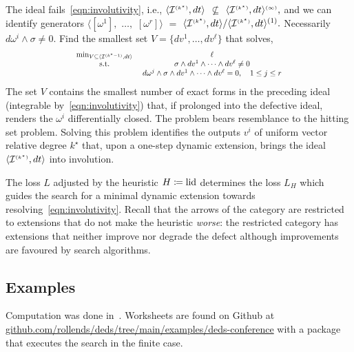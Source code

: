 \documentclass[a4paper]{ifacconf}
\begin{document}
The ideal fails~\eqref{eqn:involutivity}, i.e.,
\(
  \langle \mathcal{I}^{\smash{\scriptscriptstyle(k^\star)}}, dt \rangle
\)
\(\not\subseteq\)
\(
  \langle \mathcal{I}^{\smash{\scriptscriptstyle(k^\star)}}, dt \rangle^{\smash{\scriptscriptstyle(\infty)}},
\)
and we can identify generators
\(
  \langle [\omega^1],
\)
\(\ldots,\)
\([\omega^r] \rangle\)
\(=\)
\(
  \langle \mathcal{I}^{\smash{\scriptscriptstyle(k^\star)}}, dt \rangle / \langle \mathcal{I}^{\smash{\scriptscriptstyle(k^\star)}}, dt \rangle^{(1)}.
\)
Necessarily \(d\omega^i \wedge \sigma \neq 0.\)
Find the smallest set \(V = \{dv^1, \ldots, dv^\ell\}\) that solves,
\[
  \scalebox{0.8}{\mbox{\ensuremath{\displaystyle%
  \begin{array}{cc}
    \min_{%
        V \subseteq \langle \Ideal{I}^{\smash{\scriptscriptstyle(k^\star - 1)}}, dt\rangle        
    } 
      \;& \ell\\
    \text{s.t.}
      \;&
      \sigma \wedge dv^{1} \wedge \cdots \wedge dv^{\ell} \neq 0\\
      \;& 
      d\omega^j \wedge \sigma \wedge dv^{1} \wedge \cdots \wedge dv^{\ell} = 0,
      \quad
      1\leq j \leq r\\
  \end{array}
  }}}
\]
The set \(V\) contains the smallest number of exact forms in the preceding ideal (integrable by~\eqref{eqn:involutivity}) that, if prolonged into the defective ideal, renders the \(\omega^i\) differentially closed.
The problem bears resemblance to the hitting set problem.
Solving this problem identifies the outputs \(v^i\) of uniform vector relative degree \(k^\star\) that, upon a one-step dynamic extension, brings the ideal 
\(
  \langle \mathcal{I}^{\smash{\scriptscriptstyle(k^\star)}}, dt \rangle
\)
into involution.

The loss \(L\) adjusted by the heuristic \(H \coloneq \operatorname{lid}\) determines the loss \(L_H\) which guides the search for a minimal dynamic extension towards resolving~\eqref{eqn:involutivity}.
Recall that the arrows of the category are restricted to extensions that do not make the heuristic \emph{worse}:
the restricted category has extensions that neither improve nor degrade the defect although improvements are favoured by search algorithms.

\subsection{Examples}
Computation was done in~\cite{maple_2025}.
Worksheets are found on Github at \url{github.com/rollends/deds/tree/main/examples/deds-conference} with a package that executes the search in the finite case.
\end{document}
